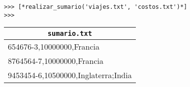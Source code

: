 \begin{enumerate}
    \begin{lstlisting}[style=consola]
>>> [*realizar_sumario('viajes.txt', 'costos.txt')*]
>>> 
    \end{lstlisting}
    
\begin{center}
    \begin{tabular}{|l|}
\multicolumn{1}{c}{\texttt{sumario.txt}}\\
    		\hline
654676-3,10000000,Francia\\
8764564-7,10000000,Francia\\
9453454-6,10500000,Inglaterra;India\\
    		\hline
	\end{tabular}
\end{center}
    
\end{enumerate}
